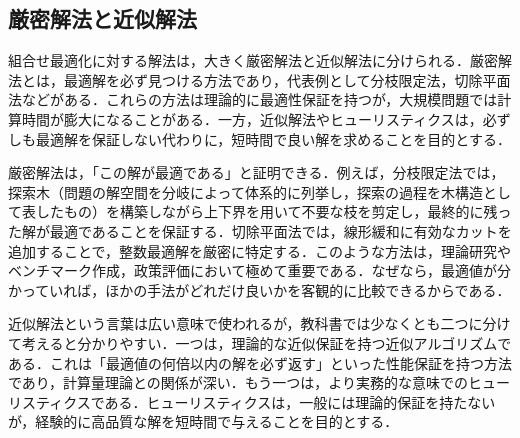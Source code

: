 \subsection{厳密解法と近似解法}

組合せ最適化に対する解法は，大きく厳密解法と近似解法に分けられる．厳密解法とは，最適解を必ず見つける方法であり，代表例として分枝限定法，切除平面法などがある．これらの方法は理論的に最適性保証を持つが，大規模問題では計算時間が膨大になることがある．一方，近似解法やヒューリスティクスは，必ずしも最適解を保証しない代わりに，短時間で良い解を求めることを目的とする．

厳密解法は，「この解が最適である」と証明できる．例えば，分枝限定法では，探索木（問題の解空間を分岐によって体系的に列挙し，探索の過程を木構造として表したもの）を構築しながら上下界を用いて不要な枝を剪定し，最終的に残った解が最適であることを保証する．切除平面法では，線形緩和に有効なカットを追加することで，整数最適解を厳密に特定する．このような方法は，理論研究やベンチマーク作成，政策評価において極めて重要である．なぜなら，最適値が分かっていれば，ほかの手法がどれだけ良いかを客観的に比較できるからである．

近似解法という言葉は広い意味で使われるが，教科書では少なくとも二つに分けて考えると分かりやすい．一つは，理論的な近似保証を持つ近似アルゴリズムである．これは「最適値の何倍以内の解を必ず返す」といった性能保証を持つ方法であり，計算量理論との関係が深い．もう一つは，より実務的な意味でのヒューリスティクスである．ヒューリスティクスは，一般には理論的保証を持たないが，経験的に高品質な解を短時間で与えることを目的とする．

